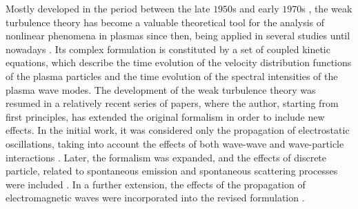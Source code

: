 \documentclass[12pt,a4paper,ruledheader]{report}
\begin{document}
Mostly developed in the period between the late $1950$s and early
$1970$s \cite{Kadomtsev1965,Tsytovich1967,saggal,tsynlep,david,
  tsyitotp,akhi2,tsytotp,mel}, the weak turbulence theory has
become a valuable theoretical tool for the analysis of nonlinear
phenomena in plasmas since then, being applied in several studies
until nowadays \cite{Grognard1982,McClements87b,Hanssen1991,
  Edney2001,Kontar2001,Kontar2002,THD13}. Its complex formulation
is constituted by a set of coupled kinetic equations, which describe
the time evolution of the velocity distribution functions of the
plasma particles and the time evolution of the spectral intensities of
the plasma wave modes. The development of the weak turbulence theory
was resumed in a relatively recent series of papers, where the author,
starting from first principles, has extended the original formalism in
order to include new effects. In the initial work, it was considered
only the propagation of electrostatic oscillations, 
taking into account the
effects of both wave-wave and wave-particle interactions \cite{Yoon00}.
Later, the formalism was expanded, and the effects of discrete particle,
related to spontaneous emission and spontaneous scattering processes
were included \cite{Yoon05a}. In a further extension, the effects of
the propagation of electromagnetic waves were incorporated into the
revised formulation \cite{Yoon06,Yoon2012b}.
\end{document}
